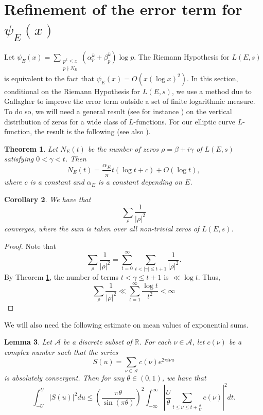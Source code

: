 \documentclass[12pt,reqno]{amsart}
\newtheorem{theorem}{Theorem}[section]
\newtheorem{corollary}[theorem]{Corollary}
\newtheorem{lemma}[theorem]{Lemma}
\theoremstyle{definition}
\numberwithin{equation}{section}
\begin{document}
\section{Refinement of the error term for \texorpdfstring{$\psi_E(x)$}{psiE(x)} } \label{sec3}



Let $\psi_E(x)=\sum \limits_{\substack{p^k \leq x \\ p\nmid N_E}} (\alpha_p^k+\beta_p^k) \log p$. The Riemann Hypothesis for $L(E, s)$ is equivalent to the fact that 
$\psi_E(x)=O(x (\log x)^2)$. In this section, conditional on the Riemann Hypothesis for $L(E, s)$,  we use a method due to Gallagher \cite{Gallagher1980} to improve the error term outside a set of finite logarithmic measure.  To do so, we will need a general result (see for instance \cite{Selberg 1992}) on the vertical distribution of zeros for a wide class of $L$-functions.  For our elliptic curve $L$-function, the result is the following (see also \cite [Theorem 2]{MurtyKim2023}). 


\begin{theorem} \label{zeros}
Let $N_E(t)$ be the number of zeros  $\rho=\beta+ i \gamma$ of $L(E, s)$ satisfying $0<\gamma<t$.  Then 
$$
N_E(t) = \frac{\alpha_E}{\pi} t(\log t+c) + O(\log t), 
$$
where $c$ is a constant and $\alpha_E$ is a constant depending on $E$. 
\end{theorem}

\begin{corollary} \label{convergencefact}
We have that
$$
\sum_{\rho} \frac{1} { |\rho|^2 } 
$$
converges, where the sum is taken over all non-trivial zeros of $L(E, s)$. 
\end{corollary}

\begin{proof}
Note that 
$$
\sum_{\rho} \frac{1}{|\rho|^2} = \sum_{t=0}^{\infty} \sum_{ t < |\gamma| \leq t+1} \frac{1}{|\rho|^2}. 
$$
By Theorem \ref{zeros}, the number of terms $t<\gamma \leq t+1$ is $\ll \log t$.  Thus, 
$$
\sum_{\rho} \frac{1}{|\rho|^2} \ll \sum_{t=1}^{\infty} \frac{\log t}{t^2}<\infty 
$$ \qedhere 
\end{proof}

We will also need the following estimate on mean values of exponential sums. 

\begin{lemma} \label{gallagher}
Let $\mathcal A$ be a discrete subset of $\mathbb R$.  For each $\nu \in \mathcal A$, let $c(\nu)$ be a complex number such that the series 
$$
S(u)= \sum_{\nu \in \mathcal A} c(\nu) e^{2 \pi i \nu u} 
$$
is absolutely convergent. Then for any $\theta \in (0, 1)$, we have that
$$
\int_{-U}^{U} |S(u)|^2 du \leq  \left( \frac{\pi \theta}{\sin (\pi \theta)} \right)^{2} \int_{-\infty}^{\infty} \left | \frac{U}{\theta} \sum_{t \leq \nu \leq t+ \frac{\theta}{U}} c(\nu) \right |^2 dt .
$$
\end{lemma}
\end{document}
